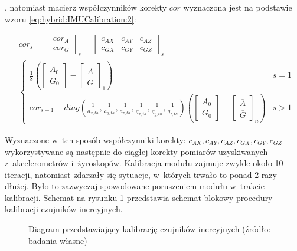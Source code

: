 , natomiast macierz współczynników korekty $cor$ wyznaczona jest na podstawie wzoru \ref{eq:hybrid:IMUCalibration:2}:

\begin{equation}
	\begin{split}
		&cor_s = \begin{bmatrix}cor_A\\ cor_G\end{bmatrix}_s = \begin{bmatrix}c_{AX} & c_{AY} & c_{AZ} \\ c_{GX} & c_{GY} & c_{GZ}\end{bmatrix}_s = \\
		&\begin{cases}
		\frac{1}{8}\left(\begin{bmatrix}A_0 \\ G_0\end{bmatrix} - \begin{bmatrix}\overline{A}\\ \overline{G}\end{bmatrix}_1\right) & s = 1\\
		cor_{s-1} - diag(\frac{1}{a_{x,th}},\frac{1}{a_{y,th}},\frac{1}{a_{z,th}},\frac{1}{g_{x,th}},\frac{1}{g_{y,th}},\frac{1}{g_{z,th}}) 
		\left(\begin{bmatrix}A_0 \\ G_0\end{bmatrix} - \begin{bmatrix}\overline{A}\\ \overline{G}\end{bmatrix}_n\right) & s > 1
		\end{cases}
	\end{split}
	\label{eq:hybrid:IMUCalibration:2}
\end{equation}

Wyznaczone w~ten sposób współczynniki korekty: $c_{AX},c_{AY},c_{AZ},c_{GX},c_{GY},c_{GZ}$ wykorzystywane są następnie do ciągłej korekty pomiarów uzyskiwanych z~akcelerometrów i~żyroskopów. Kalibracja modułu zajmuje zwykle około 10 iteracji, natomiast zdarzały się sytuacje, w~których trwało to ponad 2 razy dłużej. Było to zazwyczaj spowodowane poruszeniem modułu w~trakcie kalibracji. Schemat na rysunku \ref{fig:hybrid:IMUCalibration} przedstawia schemat blokowy procedury kalibracji czujników inercyjnych.

\begin{figure}[!htb]
	\scalebox{0.55}{		
		
	}
	\caption{Diagram przedstawiający kalibrację czujników inercyjnych (źródło: badania własne)}
	\label{fig:hybrid:IMUCalibration}
\end{figure}


